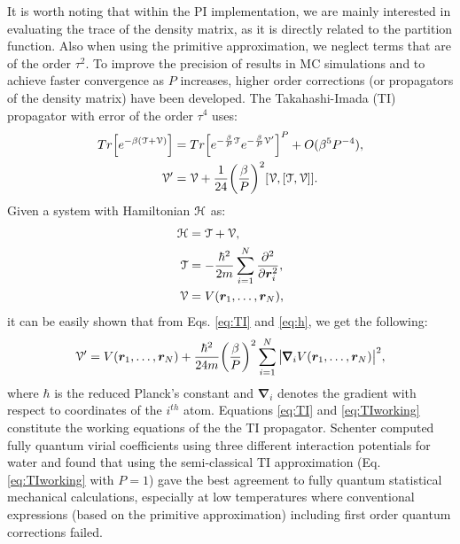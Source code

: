         It is worth noting that within the PI implementation, we are mainly interested in evaluating the trace of the density matrix, as it is directly related to the partition function. Also when using the primitive approximation, we neglect terms that are of the order $\tau^2$. To improve the precision of results in MC simulations and to achieve faster convergence as $P$ increases, higher order corrections (or propagators of the density matrix) have been developed. The Takahashi-Imada (TI) propagator \cite{Takahashi1984} with error of the order $\tau^4$ uses:
        \begin{equation}\label{eq:TI}
            \begin{aligned}
                Tr \Big[ e^{- \beta ( \mathcal{T} + \mathcal{V} )} \Big] &= Tr \Big[ e^{ -\frac{\beta}{P} \mathcal{T}} e^{-\frac{\beta}{P} \mathcal{V'}} \Big]^P + O (\beta^5 P^{-4}),\\
                \mathcal{V'} &= \mathcal{V} + \frac{1}{24} \bigg( \frac{\beta}{P} \bigg)^2 [\mathcal{V}, [\mathcal{T}, \mathcal{V}]].
            \end{aligned}
        \end{equation}
        Given a system with Hamiltonian $\mathcal{H}$ as:
        \begin{equation}\label{eq:h}
            \begin{aligned}
                \mathcal{H} &= \mathcal{T} + \mathcal{V},\\
                \mathcal{T} &= -\displaystyle\frac{\hbar^2}{2m} \sum\limits_{i=1}^N \frac{\partial^2}{\partial \bm{r}_i^2},\\
                \mathcal{V} &= V (\bm{r}_1, \ldots , \bm{r}_N),
            \end{aligned}
        \end{equation}
        it can be easily shown that from Eqs. \eqref{eq:TI} and \eqref{eq:h}, we get the following:
        \begin{equation}\label{eq:TIworking}
            \mathcal{V'} = V (\bm{r}_1, \ldots ,\bm{r}_N) + \frac{\hbar^2}{24m} \bigg(\frac{\beta}{P} \bigg)^2 \displaystyle\sum\limits_{i=1}^N \big|\pmb{\nabla}_i V (\bm{r}_1, \ldots ,\bm{r}_N) \big|^2,
        \end{equation}
        where $\hbar$ is the reduced Planck's constant and $\pmb{\nabla}_i$ denotes the gradient with respect to coordinates of the $i^{th}$ atom. Equations \eqref{eq:TI} and \eqref{eq:TIworking} constitute the working equations of the the TI propagator. Schenter \cite{Schenter2002} computed fully quantum virial coefficients using three different interaction potentials for water and found that using the semi-classical TI approximation (Eq. \eqref{eq:TIworking} with $P = 1$) gave the best agreement to fully quantum statistical mechanical calculations, especially at low temperatures where conventional expressions (based on the primitive approximation) including first order quantum corrections failed.

